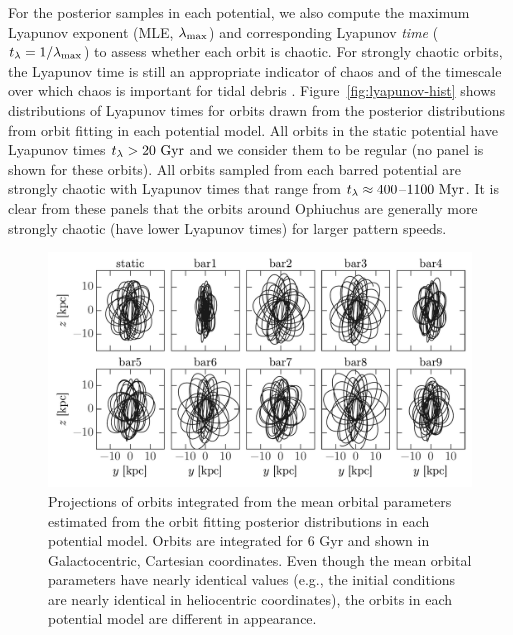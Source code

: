 For the posterior samples in each potential, we also compute the maximum
Lyapunov exponent (MLE, $\lambda_{\rm max}$) and corresponding Lyapunov \emph{time}
($t_\lambda = 1/\lambda_{\rm max}$) to assess whether each orbit is chaotic. For strongly
chaotic orbits, the Lyapunov time is still an appropriate indicator of chaos and
of the timescale over which chaos is important for tidal debris
\citep{apw15-chaos}. Figure~\ref{fig:lyapunov-hist} shows distributions of
Lyapunov times for orbits drawn from the posterior distributions from orbit
fitting in each potential model. All orbits in the static potential have
Lyapunov times $t_\lambda > 20~{\rm Gyr}$ and we consider them to be regular (no
panel is shown for these orbits). All orbits sampled from each barred potential
are strongly chaotic with Lyapunov times that range from $t_\lambda \approx
400$--$1100~{\rm Myr}$. It is clear from these panels that the orbits around
Ophiuchus are generally more strongly chaotic (have lower Lyapunov times) for
larger pattern speeds.

\begin{figure}[!th]
\begin{center}
\includegraphics[width=\textwidth]{figures/ch4/orbit-yz}
\caption{  Projections of orbits integrated from the mean orbital parameters
estimated from the orbit fitting posterior distributions in each potential
model. Orbits are integrated for 6 Gyr and shown in Galactocentric, Cartesian
coordinates. Even though the mean orbital parameters have nearly identical
values (e.g., the initial conditions are nearly identical in heliocentric
coordinates), the orbits in each potential model are  different in appearance. }
\label{fig:orbits-yz}
\end{center}
\end{figure}

